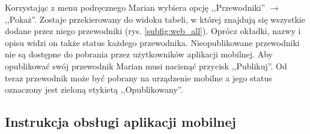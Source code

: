 \documentclass[a4paper]{book}
\begin{document}
			Korzystając z menu podręcznego Marian wybiera opcję ,,Przewodniki'' $\rightarrow$ ,,Pokaż''. Zostaje przekierowany do widoku tabeli, w której znajdują się wszystkie dodane przez niego przewodniki (rys. \ref{subfig:web_all}). Oprócz okładki, nazwy i opisu widzi on także status każdego przewodnika. Nieopublikowane przewodniki nie są dostępne do pobrania przez użytkowników aplikacji mobilnej. Aby opublikować swój przewodnik Marian musi nacisnąć przycisk ,,Publikuj''. Od teraz przewodnik może być pobrany na urządzenie mobilne a jego status oznaczony jest zieloną etykietą ,,Opublikowany''. 
		
	\subsection{Instrukcja obsługi aplikacji mobilnej}
	
\end{document}
